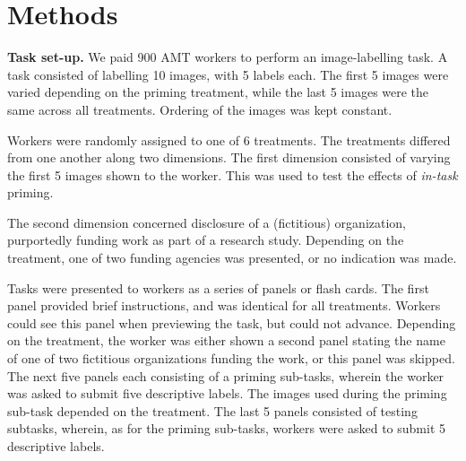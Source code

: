 \documentclass[letterpaper]{article}
\begin{document}
\section*{Methods}

\textbf{Task set-up.}
We paid 900 AMT workers to perform an image-labelling task.  A task consisted 
of labelling 10 images, with 5 labels each.  The first 5 images were varied 
depending on the priming treatment, while the last 5 images were the same 
across all treatments.  Ordering of the images was kept constant.

Workers were randomly assigned to one of 6 treatments.  The treatments differed
from one another along two dimensions. The first dimension consisted of 
varying the first 5 images shown to the worker.  This was used to test the
effects of \textit{in-task} priming.

The second dimension concerned disclosure of a (fictitious) organization,
purportedly funding work as part of a research study.  Depending on the 
treatment, one of two funding agencies was presented, or no indication was 
made.

Tasks were presented to workers as a series of panels or flash cards.  The
first panel provided brief instructions, and was identical for all treatments.
Workers could see this panel when previewing the task, but could not advance.
Depending on the treatment, the worker was either shown a second panel 
stating the name of 
one of two fictitious organizations funding the work, or this panel was 
skipped.  The next five panels each consisting of a priming sub-tasks, 
wherein the worker was asked to submit five descriptive labels.  The images
used during the priming sub-task depended on the treatment.  The last 5 panels
consisted of testing subtasks, wherein, as for the priming sub-tasks, workers
were asked to submit 5 descriptive labels.
\end{document}
